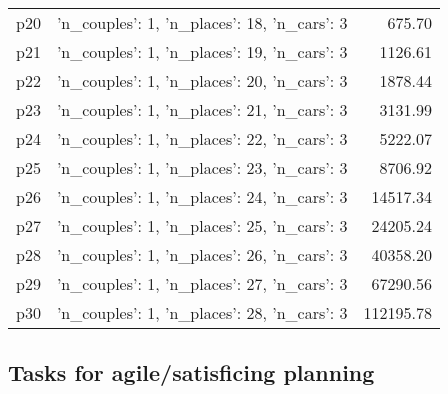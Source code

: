 \documentclass{article}
\begin{document}
\begin{center}
\begin{tabular}{@{}l|r|r@{}}
  p20&{'n\_couples': 1, 'n\_places': 18, 'n\_cars': 3}&675.70\\
  p21&{'n\_couples': 1, 'n\_places': 19, 'n\_cars': 3}&1126.61\\
  p22&{'n\_couples': 1, 'n\_places': 20, 'n\_cars': 3}&1878.44\\
  p23&{'n\_couples': 1, 'n\_places': 21, 'n\_cars': 3}&3131.99\\
  p24&{'n\_couples': 1, 'n\_places': 22, 'n\_cars': 3}&5222.07\\
  p25&{'n\_couples': 1, 'n\_places': 23, 'n\_cars': 3}&8706.92\\
  p26&{'n\_couples': 1, 'n\_places': 24, 'n\_cars': 3}&14517.34\\
  p27&{'n\_couples': 1, 'n\_places': 25, 'n\_cars': 3}&24205.24\\
  p28&{'n\_couples': 1, 'n\_places': 26, 'n\_cars': 3}&40358.20\\
  p29&{'n\_couples': 1, 'n\_places': 27, 'n\_cars': 3}&67290.56\\
  p30&{'n\_couples': 1, 'n\_places': 28, 'n\_cars': 3}&112195.78
                            \end{tabular}
                            \end{center}
                    

                                \subsection*{Tasks for agile/satisficing planning}
                                
\end{document}
